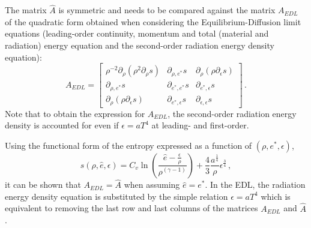 \documentclass[times,doublespace]{fldauth}%
\begin{document}
The matrix $\hat{A}$ is symmetric and needs to be compared against the matrix $A_{EDL}$ of the quadratic form obtained when considering the Equilibrium-Diffusion limit equations (leading-order continuity, momentum and total (material and radiation) energy equation and the second-order radiation energy density equation):
%
 \begin{equation}
 A _{EDL}= 
\begin{bmatrix}
\rho^{-2}\partial_{\rho} \left( \rho^2 \partial_{\rho} s \right) & \partial_{\rho,e^*} s & \partial_{\rho} \left( \rho \partial_{\epsilon} s \right) \\
 \partial_{\rho,e^*} s & \partial_{e^*,e^*} s & \partial_{e^*,\epsilon} s \\
 \partial_{\rho} \left( \rho \partial_{\epsilon} s \right) & \partial_{e^*,\epsilon} s & \partial_{\epsilon,\epsilon} s
\end{bmatrix}
\,.
\end{equation}
%
Note that to obtain the expression for $A_{EDL}$, the second-order radiation energy density is accounted for even if $\epsilon = aT^4$ at leading- and first-order.

Using the functional form of the entropy expressed as a function of $(\rho, e^*, \epsilon)$, 
%
\begin{equation}
s(\rho, \hat{e}, \epsilon) = C_v \ln \left( \frac{\hat{e}-\frac{\epsilon}{\rho}}{\rho^(\gamma-1)} \right) + \frac{4}{3} \frac{a^\frac{1}{4}}{\rho} \epsilon^\frac{3}{4} \, ,
\end{equation}
%
it can be shown that $A_{EDL} = \hat{A}$ when assuming $\hat{e} = e^*$. In the EDL, the radiation energy density equation is substituted by the simple relation $\epsilon = a T^4$ which is equivalent to removing the last row and last columns of the matrices $A_{EDL}$ and $\hat{A}$.
\end{document}
